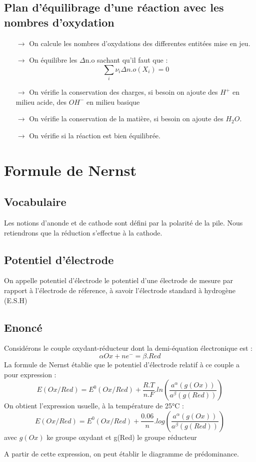 \subsection{Plan d'équilibrage d'une réaction avec les nombres d'oxydation}
\begin{itemize}
 \item[$\rightarrow$] On calcule les nombres d'oxydations des differentes entitées mise en jeu.\\
 \item[$\rightarrow$] On équilibre les $\Delta$n.o sachant qu'il faut que : $$\sum_i \nu_i \Delta n.o (X_i) = 0$$
 \item[$\rightarrow$] On vérifie la conservation des charges, si besoin on ajoute des $H^+$ en milieu acide, des $OH^-$ en milieu basique\\
 \item[$\rightarrow$] On vérifie la conservation de la matière, si besoin on ajoute des $H_2O$. \\
 \item[$\rightarrow$] On vérifie si la réaction est bien équilibrée.\\
\end{itemize}
\section{Formule de Nernst}
\subsection{Vocabulaire}
\begin{de}
Les notions d'anonde et de cathode sont défini par la polarité de la pile. Nous retiendrons que la réduction s'effectue à la cathode.
\end{de}
\subsection{Potentiel d'électrode}
\begin{de}
On appelle potentiel d'électrode le potentiel d'une électrode de mesure par rapport à l'électrode de réference, à savoir l'électrode standard à hydrogène (E.S.H)
\end{de}
\subsection{Enoncé}
\begin{de}
Considérons le couple oxydant-réducteur dont la demi-équation électronique est :
$$\alpha Ox+ne^- = \beta.Red$$
La formule de Nernst établie que le potentiel d'électrode relatif à ce couple a pour expression :
$$E(Ox/Red) = E^0(Ox/Red) + \dfrac{R.T}{n.F}.ln\left( \dfrac{a^{\alpha}(g(Ox))}{a^{\beta}(g(Red))}\right) $$
On obtient l'expression usuelle, à la température de 25°C :
$$E(Ox/Red) = E^0(Ox/Red) + \dfrac{0.06}{n}.log\left( \dfrac{a^{\alpha}(g(Ox))}{a^{\beta}(g(Red))}\right) $$
avec $g(Ox)$ ke groupe oxydant et g(Red) le groupe réducteur
\end{de}
A partir de cette expression, on peut établir le diagramme de prédominance.
